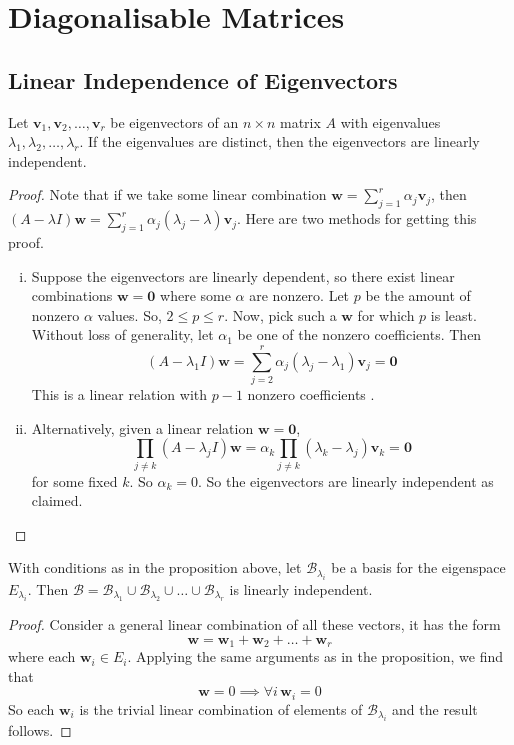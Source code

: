 \documentclass{article}
\begin{document}
\section{Diagonalisable Matrices}
\subsection{Linear Independence of Eigenvectors}
\begin{proposition}
	Let $\bm v_1, \bm v_2, \dots, \bm v_r$ be eigenvectors of an $n\times n$ matrix $A$ with eigenvalues $\lambda_1, \lambda_2,\dots,\lambda_r$. If the eigenvalues are distinct, then the eigenvectors are linearly independent.
\end{proposition}
\begin{proof}
	Note that if we take some linear combination $\bm w = \sum_{j=1}^r \alpha_j\bm v_j$, then $(A - \lambda I)\bm w = \sum_{j=1}^r \alpha_j(\lambda_j - \lambda)\bm v_j$. Here are two methods for getting this proof.
	\begin{enumerate}[(i)]
		\item Suppose the eigenvectors are linearly dependent, so there exist linear combinations $\bm w = \bm 0$ where some $\alpha$ are nonzero. Let $p$ be the amount of nonzero $\alpha$ values. So, $2 \leq p \leq r$. Now, pick such a $\bm w$ for which $p$ is least. Without loss of generality, let $\alpha_1$ be one of the nonzero coefficients. Then
		      \[ (A - \lambda_1 I)\bm w = \sum_{j=2}^r \alpha_j(\lambda_j - \lambda_1)\bm v_j = \bm 0 \]
		      This is a linear relation with $p-1$ nonzero coefficients \contradiction.
		\item Alternatively, given a linear relation $\bm w=\bm 0$,
		      \[ \prod_{j \neq k} (A - \lambda_j I) \bm w = \alpha_k \prod_{j \neq k} (\lambda_k - \lambda_j) \bm v_k = \bm 0 \]
		      for some fixed $k$. So $\alpha_k = 0$. So the eigenvectors are linearly independent as claimed.
	\end{enumerate}
\end{proof}
\begin{corollary}
	With conditions as in the proposition above, let $\mathcal B_{\lambda_i}$ be a basis for the eigenspace $E_{\lambda_i}$. Then $\mathcal B = \mathcal B_{\lambda_1} \cup \mathcal B_{\lambda_2} \cup \dots \cup \mathcal B_{\lambda_r}$ is linearly independent.
\end{corollary}
\begin{proof}
	Consider a general linear combination of all these vectors, it has the form
	\[ \bm w = \bm w_1 + \bm w_2 + \dots + \bm w_r \]
	where each $\bm w_i \in E_i$. Applying the same arguments as in the proposition, we find that
	\[ \bm w = 0 \implies \forall i\,\bm w_i = 0 \]
	So each $\bm w_i$ is the trivial linear combination of elements of $\mathcal B_{\lambda_i}$ and the result follows.
\end{proof}
\end{document}
